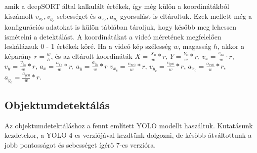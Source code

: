\documentclass[acmtog, authorversion]{acmart}
\begin{document}
amik a deepSORT által kalkulált értékek, így még külön a koordinátákból kiszámolt \begin{math}v_{x_c},v_{y_c}\end{math} sebességet és
\begin{math}a_{x_c},a_{y_c}\end{math} gyorsulást is eltároltuk.
Ezek mellett még a konfigurációs adatokat is külön táblában tároljuk, hogy később meg lehessen ismételni a detektálást. 
A koordinátákat a videó méretének megfelelően leskálázzuk 0 - 1 értékek köré. Ha a videó kép szélesség \begin{math}w\end{math}, magasság \begin{math}h\end{math}, 
akkor a képarány \begin{math}r = \frac{w}{h}\end{math}, és az eltárolt koordináták \begin{math}X = \frac{X_0}{w} * r\end{math}, \begin{math}Y = \frac{Y_0}{w} * r\end{math},
\begin{math}v_x = \frac{v_{x_0}}{w} \cdot r\end{math}, \begin{math}v_y = \frac{v_{y_0}}{w} * r\end{math}, \begin{math}a_x = \frac{a_{x_0}}{w} * r\end{math}, \begin{math}a_y = \frac{a_{y_0}}{w} * r\end{math}
\begin{math}v_{x_c} = \frac{v_{xc0}}{w} * r\end{math}, \begin{math}v_{y_c} = \frac{v_{yc0}}{w} * r\end{math}, \begin{math}a_{x_c} = \frac{a_{xc0}}{w} * r\end{math}, \begin{math}a_{y_c} = \frac{a_{yc0}}{w} * r\end{math}.
\subsection{Objektumdetektálás}
Az objektumdetektáláshoz a fennt említett YOLO modellt haszáltuk. Kutatásunk kezdetekor, a YOLO 4-es verziójával kezdtünk dolgozni,
de később átváltottunk a jobb pontosságot és sebességet ígérő 7-es verzióra.
\end{document}
